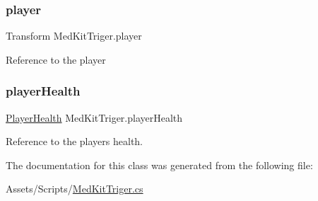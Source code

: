 \subsubsection{\texorpdfstring{player}{player}}
{\footnotesize\ttfamily Transform Med\+Kit\+Triger.\+player\hspace{0.3cm}{\ttfamily [private]}}

Reference to the player \mbox{\label{class_med_kit_triger_ac21e65fa7cf7d7d83f13289a58177c22}} 
\subsubsection{\texorpdfstring{playerHealth}{playerHealth}}
{\footnotesize\ttfamily \mbox{\hyperlink{class_player_health}{Player\+Health}} Med\+Kit\+Triger.\+player\+Health\hspace{0.3cm}{\ttfamily [private]}}

Reference to the player\textquotesingle{}s health. 

The documentation for this class was generated from the following file\+:\begin{DoxyCompactItemize}
\item 
Assets/\+Scripts/\mbox{\hyperlink{_med_kit_triger_8cs}{Med\+Kit\+Triger.\+cs}}\end{DoxyCompactItemize}
